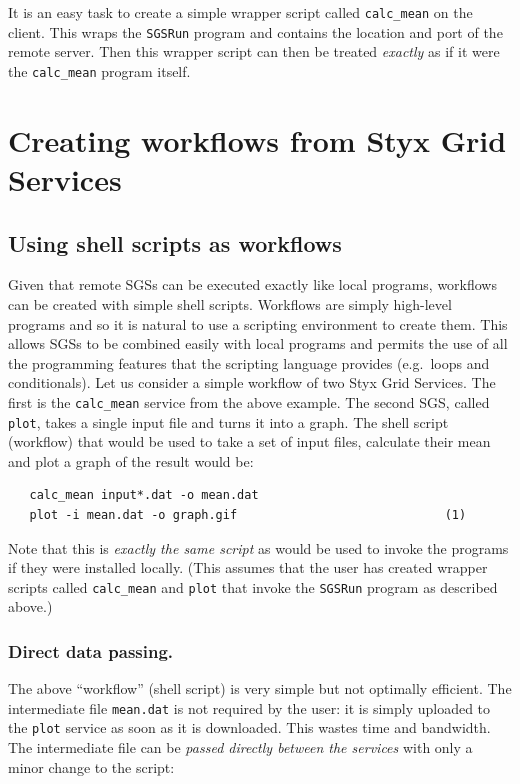 \documentclass{article}
\begin{document}
It is an easy task to create a simple wrapper script called {\tt calc\_mean} on the client.  This wraps the {\tt SGSRun} program and contains the location and port of the remote server.  Then this wrapper script can then be treated {\em exactly\/} as if it were the {\tt calc\_mean} program itself.


\section{Creating workflows from Styx Grid Services}

\subsection{Using shell scripts as workflows}\label{sec:shellscripts}
Given that remote SGSs can be executed exactly like local programs, workflows can be created with simple shell scripts.  Workflows are simply high-level programs and so it is natural to use a scripting environment to create them.  This allows SGSs to be combined easily with local programs and permits the use of all the programming features that the scripting language provides (e.g.\ loops and conditionals).  Let us consider a simple workflow of two Styx Grid Services.  The first is the {\tt calc\_mean} service from the above example.  The second SGS, called {\tt plot}, takes a single input file and turns it into a graph.  The shell script (workflow) that would be used to take a set of input files, calculate their mean and plot a graph of the result would be:

\begin{verbatim}
   calc_mean input*.dat -o mean.dat
   plot -i mean.dat -o graph.gif                             (1)
\end{verbatim}

Note that this is {\em exactly the same script\/} as would be used to invoke the programs if they were installed locally.  (This assumes that the user has created wrapper scripts called {\tt calc\_mean} and {\tt plot} that invoke the {\tt SGSRun} program as described above.)

\subsubsection{Direct data passing.}\label{sec:datapassing}

The above ``workflow'' (shell script) is very simple but not optimally efficient.  The intermediate file {\tt mean.dat} is not required by the user: it is simply uploaded to the {\tt plot} service as soon as it is downloaded.  This wastes time and bandwidth.  The intermediate file can be {\em passed directly between the services\/} with only a minor change to the script:
\end{document}
